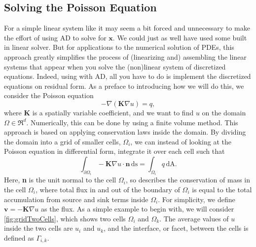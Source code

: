 \subsection{Solving the Poisson Equation}
\label{sec:poissonEq}
For a simple linear system like  it may seem a bit forced and unnecessary to make the effort of using AD to solve for $\boldsymbol{x}$. We could just as well have used some built in linear solver. But for applications to the numerical solution of PDEs, this approach greatly simplifies the process of (linearizing and) assembling the linear systems that appear when you solve the (non)linear system of discretized equations. Indeed, using  with AD, all you have to do is implement the discretized equations on residual form.  As a preface to introducing how we will do this, we consider the Poisson equation
\begin{equation}
    -\nabla(\textbf{K}\nabla u) = q,
    \label{eq:Poisson}
\end{equation}
where \textbf{K} is a spatially variable coefficient, and we want to find $u$ on the domain $\Omega \in \Re^d$. Numerically, this can be done by using a finite volume method. This approach is based on applying conservation laws inside the domain. By dividing the domain into a grid of smaller cells, $\Omega_i$, we can instead of looking at the Poisson equation in differential form, integrate it over each cell such that
\begin{equation}
    \int_{\partial\Omega_i}\!\!- \textbf{K} \nabla u \cdot \textbf{n}\, \mbox{ds} = \int_{\Omega_i} q \,\mbox{dA}.
    \label{eq:conservation}
\end{equation}
Here, \textbf{n} is the unit normal to the cell $\Omega_i$, so  describes the conservation of mass in the cell $\Omega_i$, where total flux in and out of the boundary of $\Omega_i$ is equal to the total accumulation from source and sink terms inside $\Omega_i$. For simplicity, we define $\textbf{v} = - \textbf{K} \nabla u$ as the flux. As a simple example to begin with, we will consider \autoref{fig:gridTwoCells}, which shows two cells $\Omega_i$ and $\Omega_k$. The average values of $u$ inside the two cells are $u_i$ and $u_k$, and the interface, or facet, between the cells is defined as $\Gamma_{i,k}$.
